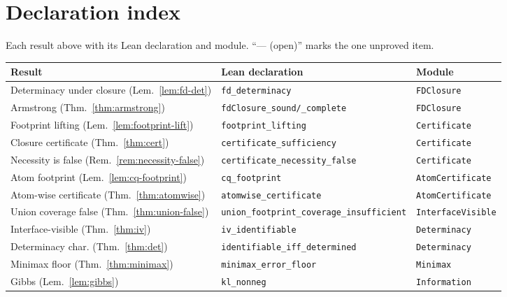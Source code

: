 \documentclass[11pt]{article}
\newcommand{\lean}[1]{\texttt{#1}}           %
\theoremstyle{plain}
\theoremstyle{definition}
\begin{document}
\appendix
\section{Declaration index}\label{app:index}

Each result above with its Lean declaration and module. ``--- (open)'' marks the one
unproved item.

\begin{center}\small
\begin{tabular}{lll}
\hline
\textbf{Result} & \textbf{Lean declaration} & \textbf{Module} \\
\hline
Determinacy under closure (Lem.~\ref{lem:fd-det})   & \lean{fd\_determinacy}            & \lean{FDClosure} \\
Armstrong (Thm.~\ref{thm:armstrong})                & \lean{fdClosure\_sound/\_complete}& \lean{FDClosure} \\
Footprint lifting (Lem.~\ref{lem:footprint-lift})   & \lean{footprint\_lifting}        & \lean{Certificate} \\
Closure certificate (Thm.~\ref{thm:cert})           & \lean{certificate\_sufficiency}  & \lean{Certificate} \\
Necessity is false (Rem.~\ref{rem:necessity-false}) & \lean{certificate\_necessity\_false} & \lean{Certificate} \\
Atom footprint (Lem.~\ref{lem:cq-footprint})        & \lean{cq\_footprint}             & \lean{AtomCertificate} \\
Atom-wise certificate (Thm.~\ref{thm:atomwise})     & \lean{atomwise\_certificate}     & \lean{AtomCertificate} \\
Union coverage false (Thm.~\ref{thm:union-false})   & \lean{union\_footprint\_coverage\_insufficient} & \lean{InterfaceVisible} \\
Interface-visible (Thm.~\ref{thm:iv})               & \lean{iv\_identifiable}          & \lean{Determinacy} \\
Determinacy char. (Thm.~\ref{thm:det})              & \lean{identifiable\_iff\_determined} & \lean{Determinacy} \\
Minimax floor (Thm.~\ref{thm:minimax})              & \lean{minimax\_error\_floor}     & \lean{Minimax} \\
Gibbs (Lem.~\ref{lem:gibbs})                        & \lean{kl\_nonneg}                & \lean{Information} \\

\end{tabular}
\end{center}
\end{document}
